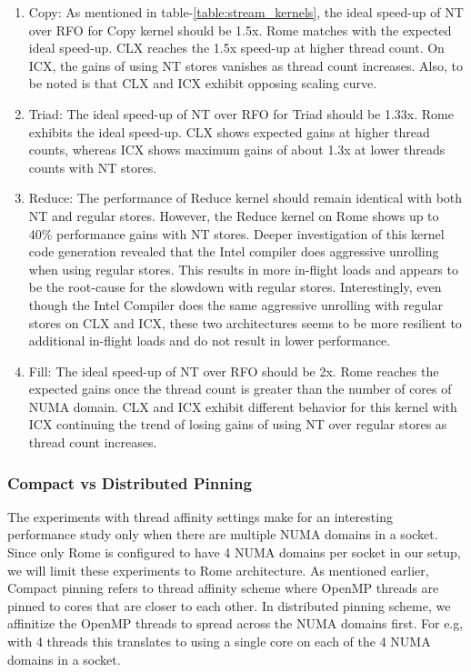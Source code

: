 \documentclass{article}
\begin{document}
\begin{enumerate}
\item Copy: As mentioned in table-\ref{table:stream_kernels}, the ideal speed-up of NT over RFO for Copy kernel should be 1.5x. Rome matches with the expected ideal speed-up. CLX reaches the 1.5x speed-up at higher thread count. On ICX, the gains of using NT stores vanishes as thread count increases. Also, to be noted is that CLX and ICX exhibit opposing scaling curve.
\item Triad: The ideal speed-up of NT over RFO for Triad should be 1.33x. Rome exhibits the ideal speed-up. CLX shows expected gains at higher thread counts, whereas ICX shows maximum gains of about 1.3x at lower threads counts with NT stores.
\item Reduce: The performance of Reduce kernel should remain identical with both NT and regular stores. However, the Reduce kernel on Rome shows up to 40\% performance gains with NT stores. Deeper investigation of this kernel code generation revealed that the Intel compiler does aggressive unrolling when using regular stores. This results in more in-flight loads and appears to be the root-cause for the slowdown with regular stores. Interestingly, even though the Intel Compiler does the same aggressive unrolling with regular stores on CLX and ICX, these two architectures seems to be more resilient to additional in-flight loads and do not result in lower performance.
\item Fill: The ideal speed-up of NT over RFO should be 2x. Rome reaches the expected gains once the thread count is greater than the number of cores of NUMA domain. CLX and ICX exhibit different behavior for this kernel with ICX continuing the trend of losing gains of using NT over regular stores as thread count increases.
\end{enumerate}


\subsubsection{Compact vs Distributed Pinning}
The experiments with thread affinity settings make for an interesting performance study only when there are multiple NUMA domains in a socket. Since only Rome is configured to have 4 NUMA domains per socket in our setup, we will limit these experiments to Rome architecture. As mentioned earlier, Compact pinning refers to thread affinity scheme where OpenMP threads are pinned to cores that are closer to each other. In distributed pinning scheme, we affinitize the OpenMP threads to spread across the NUMA domains first. For e.g, with 4 threads this translates to using a single core on each of the 4 NUMA domains in a socket.
\end{document}
